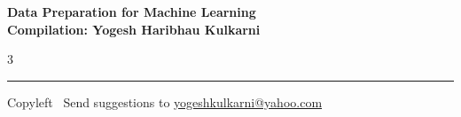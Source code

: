 \documentclass[8pt,landscape]{article}
\begin{document}
\footnotesize


\begin{center}
\Large{\textbf{Data Preparation for Machine Learning\\ Compilation: Yogesh Haribhau Kulkarni}}
\end{center}

\begin{multicols}{3}

\end{multicols}

\rule{\linewidth}{0.25pt}
\scriptsize
Copyleft \textcopyleft\  Send suggestions to
\href{http://www.yogeshkulkarni.com}{yogeshkulkarni@yahoo.com}
\end{document}
